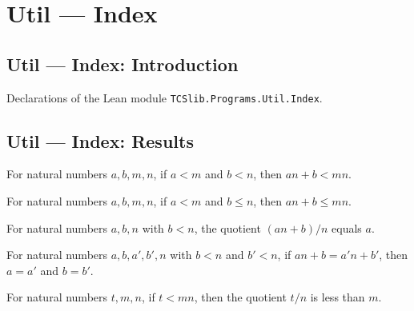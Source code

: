 \section{Util --- Index}
\subsection*{Util --- Index: Introduction}

Declarations of the Lean module \texttt{TCSlib.Programs.Util.Index}.

\subsection*{Util --- Index: Results}

\begin{theorem}
\label{Nat.mul_add_lt_mul}
\leanok
{}
For natural numbers $a,b,m,n$, if $a<m$ and $b<n$, then $an+b<mn$.
\end{theorem}

\begin{theorem}
\label{Nat.mul_add_le_mul}
\leanok
{}
For natural numbers $a,b,m,n$, if $a<m$ and $b\le n$, then $an+b\le mn$.
\end{theorem}

\begin{theorem}
\label{Nat.mul_add_div_of_lt}
\leanok
{}
For natural numbers $a,b,n$ with $b<n$, the quotient $(an+b)/n$ equals $a$.
\end{theorem}

\begin{theorem}
\label{Nat.mul_add_inj_of_lt}
\leanok
{}
For natural numbers $a,b,a',b',n$ with $b<n$ and $b'<n$, if $an+b=a'n+b'$, then $a=a'$
and $b=b'$.
\end{theorem}

\begin{theorem}
\label{Nat.div_lt_of_lt_mul'}
\leanok
{}
For natural numbers $t,m,n$, if $t<mn$, then the quotient $t/n$ is less than $m$.
\end{theorem}

